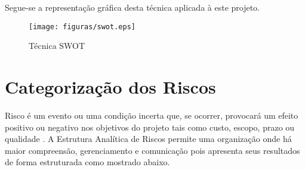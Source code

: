 Segue-se a representação gráfica desta técnica aplicada à este projeto.

\pagebreak

\begin{figure}[!h]
 \centering
 \texttt{[image: figuras/swot.eps]}
 \caption{Técnica SWOT}
\end{figure}

\section{Categorização dos Riscos}
Risco é um evento ou uma condição incerta que, se ocorrer, provocará um efeito positivo ou negativo nos objetivos do projeto tais como custo, escopo, prazo ou qualidade \cite{bianco}. A Estrutura Analítica de Riscos permite uma organização onde há maior compreensão, gerenciamento e comunicação pois apresenta seus resultados de forma estruturada como mostrado abaixo.
